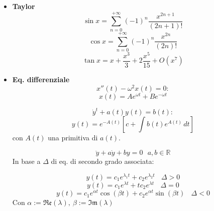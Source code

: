 \documentclass{article}
\newcommand{\re}{\mathfrak{Re}}
\newcommand{\im}{\mathfrak{Im}}
\begin{document}
\begin{footnotesize}
\begin{multicols*}{3}
\begin{itemize}[leftmargin=*]
	\item \textbf{Taylor}
		\[\sin x = \sum_{n=0}^{+\infty }(-1)^n \frac{x^{2n+1}}{(2n+1)!}\]
		\[\cos x = \sum_{n=0}^{+\infty }(-1)^n \frac{x^{2n}}{(2n)!}\]
		\[\tan x = x + \frac{x^3}{3} + 2\frac{x^5}{15} + O(x^7)\]

	\item \textbf{Eq. differenziale}
		\[x''(t)-\omega ^2x(t) = 0:\]
		\[x(t) = Ae^{\omega t} + Be^{-\omega t}\]

		\[\dot{y}^t + a(t)y(t) = b(t):\]
		\[y(t) = e^{-A(t)}\left[c+ \int b(t)e^{A(t)}\,dt\right]\]
		con $A(t)$ una primitiva di $a(t)$.

		\[\ddot{y} + a\dot{y} + by = 0\ \ \ a,b\in \mathbb{R}\]
		In base a $\Delta $ di eq. di secondo grado associata:

		\[y(t) = c_1e^{\lambda _1t} + c_2e^{\lambda _2t} \ \ \ \  \Delta >0\]
		\[y(t) = c_1e^{\lambda t} + tc_2e^{\lambda t} \ \ \ \  \Delta =0\]
		\[y(t) = c_1e^{\alpha  t}\cos(\beta t) + c_2e^{\alpha  t}\sin(\beta t) \ \ \  \ \Delta <0\]
		Con $\alpha := \re(\lambda ),\ \beta :=\im(\lambda )$




\end{itemize}
\end{multicols*}
\end{footnotesize}
\end{document}
